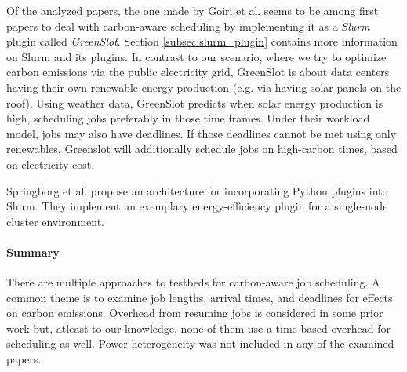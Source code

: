 Of the analyzed papers, the one made by Goiri et al. \cite{inigo_goiri_greenslot_2011} seems to be among first papers to deal with carbon-aware scheduling by implementing it as a \emph{Slurm} plugin called \emph{GreenSlot}. 
Section \ref{subsec:slurm_plugin} contains more information on Slurm and its plugins.
In contrast to our scenario, where we try to optimize carbon emissions via the public electricity grid, GreenSlot is about data centers having their own renewable energy production (e.g. via having solar panels on the roof). 
Using weather data, GreenSlot predicts when solar energy production is high, scheduling jobs preferably in those time frames.
Under their workload model, jobs may also have deadlines.
If those deadlines cannot be met using only renewables, Greenslot will additionally schedule jobs on high-carbon times, based on electricity cost.

Springborg et al. \cite{aaen_springborg_automatic_2023} propose an architecture for incorporating Python plugins into Slurm. 
They implement an exemplary energy-efficiency plugin for a single-node cluster environment. 

\paragraph{Summary}
There are multiple approaches to testbeds for carbon-aware job scheduling. 
A common theme is to examine job lengths, arrival times, and deadlines for effects on carbon emissions. 
Overhead from resuming jobs is considered in some prior work but, atleast to our knowledge, none of them use a time-based overhead for scheduling as well. 
Power heterogeneity was not included in any of the examined papers.


